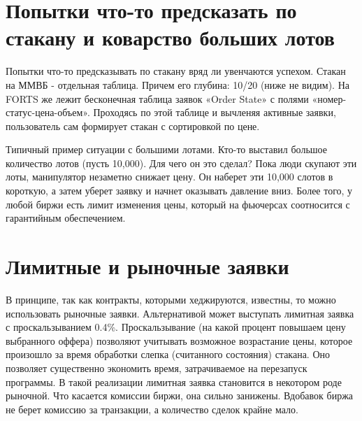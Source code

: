 \documentclass{article}
\begin{document}
\section{Попытки что-то предсказать по стакану и коварство больших лотов}

Попытки что-то предсказывать по стакану вряд ли увенчаются успехом. Стакан на ММВБ - отдельная таблица. Причем его глубина: 10/20 (ниже не видим). На FORTS же лежит бесконечная таблица заявок «Order State» с полями «номер-статус-цена-объем». Проходясь по этой таблице и вычленяя активные заявки, пользователь сам формирует стакан с сортировкой по цене.

Типичный пример ситуации с большими лотами. Кто-то выставил большое количество лотов (пусть 10,000). Для чего он это сделал? Пока люди скупают эти лоты, манипулятор незаметно снижает цену. Он наберет эти 10,000 слотов в короткую, а затем уберет заявку и начнет оказывать давление вниз. Более того, у любой биржи есть лимит изменения цены, который на фьючерсах соотносится с гарантийным обеспечением. 

\section{Лимитные и рыночные заявки}

В принципе, так как контракты, которыми хеджируются, известны, то можно использовать рыночные заявки. Альтернативой может выступать лимитная заявка с проскальзыванием 0.4\%. Проскальзывание (на какой процент повышаем цену выбранного оффера) позволяют учитывать возможное возрастание цены, которое произошло за время обработки слепка (считанного состояния) стакана. Оно позволяет существенно экономить время, затрачиваемое на перезапуск программы. В такой реализации лимитная заявка становится в некотором роде рыночной. Что касается комиссии биржи, она сильно занижены. Вдобавок биржа не берет комиссию за транзакции, а количество сделок крайне мало.
\end{document}
